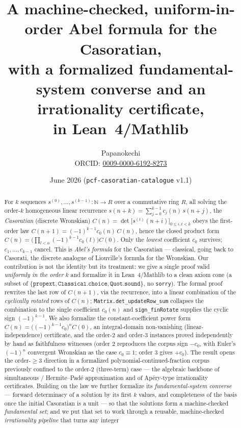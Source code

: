 \documentclass[11pt]{article}
\title{A machine-checked, uniform-in-order Abel formula for the Casoratian,\\
with a formalized fundamental-system converse and an irrationality certificate,\\
in Lean~4/Mathlib}
\author{Papanokechi\\
\small ORCID: \href{https://orcid.org/0009-0000-6192-8273}{0009-0000-6192-8273}}
\date{June 2026 \quad(\texttt{pcf-casoratian-catalogue} v1.1)}
\newcommand{\N}{\mathbb{N}}
\newcommand{\Caso}{C}
\begin{document}
\maketitle

\begin{abstract}
For $k$ sequences $s^{(0)},\dots,s^{(k-1)}\colon\N\to R$ over a commutative ring $R$,
all solving the order-$k$ homogeneous linear recurrence
$s(n+k)=\sum_{j=0}^{k-1}c_j(n)\,s(n+j)$, the \emph{Casoratian} (discrete Wronskian)
$\Caso(n)=\det\big[s^{(t)}(n+i)\big]_{0\le i,t<k}$ obeys the first-order law
$\Caso(n+1)=(-1)^{k-1}c_0(n)\,\Caso(n)$, hence the closed product form
$\Caso(n)=\big(\prod_{l<n}(-1)^{k-1}c_0(l)\big)\Caso(0)$. Only the \emph{lowest}
coefficient $c_0$ survives; $c_1,\dots,c_{k-1}$ cancel. This is \emph{Abel's formula}
for the Casoratian --- classical, going back to Casorati, the discrete analogue of
Liouville's formula for the Wronskian. Our contribution is not the identity but its treatment: we give a single
proof valid \emph{uniformly in the order} $k$ and formalize it in Lean~4/Mathlib to a
clean axiom cone (a subset of $\{\texttt{propext},\texttt{Classical.choice},
\texttt{Quot.sound}\}$, no \texttt{sorry}). The formal proof rewrites the last row of
$\Caso(n+1)$, via the recurrence, into a linear combination of the
\emph{cyclically rotated} rows of $\Caso(n)$; \texttt{Matrix.det\_updateRow\_sum}
collapses the combination to the single coefficient $c_0(n)$ and
\texttt{sign\_finRotate} supplies the cyclic sign $(-1)^{k-1}$. We also formalize the
constant-coefficient power form $\Caso(n)=\big((-1)^{k-1}c_0\big)^n\Caso(0)$, an
integral-domain non-vanishing (linear-independence) certificate, and the
order-$2$ and order-$3$ instances proved independently by hand as faithfulness
witnesses (order $2$ reproduces the corpus sign $-c_0$, with Euler's $(-1)^n$
convergent Wronskian as the case $c_0\equiv1$; order $3$ gives $+c_0$). The result
opens the order-$\ge3$ direction in a formalized polynomial-continued-fraction corpus
previously confined to the order-$2$ (three-term) case --- the algebraic backbone of
simultaneous / Hermite--Pad\'e approximation and of Ap\'ery-type irrationality
certificates. Building on the law we further formalize its \emph{fundamental-system
converse} --- forward determinacy of a solution by its first $k$ values, and
completeness of the basis once the initial Casoratian is a unit --- so that the
solutions form a machine-checked \emph{fundamental set}; and we put that set to work
through a reusable, machine-checked \emph{irrationality pipeline} that turns any integer

\end{abstract}
\end{document}
